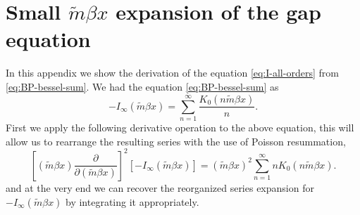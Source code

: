 \documentclass[a4paper,11pt]{article}
\newcommand{\e}{\mathrm e}
\newcommand{\dd}{\mathrm d}
\begin{document}
\section{Small $\tilde m \beta x$ expansion of the gap equation}
\label{app:bessel-poisson}

In this appendix we show the derivation of the equation \eqref{eq:I-all-orders} from \eqref{eq:BP-bessel-sum}.
We had the equation \eqref{eq:BP-bessel-sum} as
\begin{equation}
	-I_\infty(\tilde m\beta x)
	=\sum_{n=1}^\infty\frac{K_0(n\tilde m\beta x)}{n}.
	\label{eq:BP-bessel-sum-appen}
\end{equation}
First we apply the following derivative operation to the above equation, this will allow us to rearrange the resulting series with the use of Poisson resummation, 
\begin{equation}
	\left[(\tilde m\beta x)\frac{\partial}{\partial(\tilde m\beta x)}\right]^2
	[-I_\infty(\tilde m\beta x)]
	=(\tilde m\beta x)^2\sum_{n=1}^\infty nK_0(n\tilde m\beta x).
	\label{eq:BP-differential-reduction}
\end{equation}
and at the very end we can recover the reorganized series expansion for  $  -I_\infty (\tilde m \beta x)$ by integrating it appropriately.\\
\end{document}
